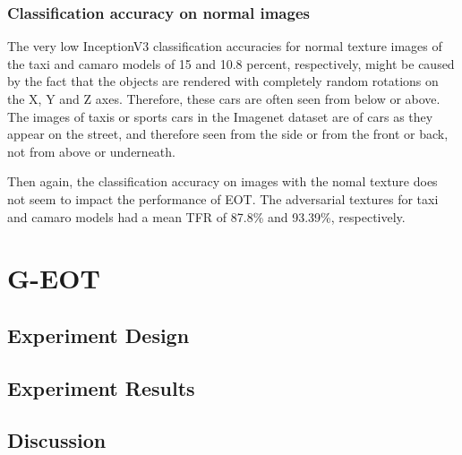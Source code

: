 \subsubsection{Classification accuracy on normal images}

The very low InceptionV3 classification accuracies for normal texture images of the taxi and camaro models of 15 and 10.8 percent, respectively, might be caused by the fact that the objects are rendered with completely random rotations on the X, Y and Z axes. Therefore, these cars are often seen from below or above. The images of taxis or sports cars in the Imagenet dataset are of cars as they appear on the street, and therefore seen from the side or from the front or back, not from above or underneath.

Then again, the classification accuracy on images with the nomal texture does not seem to impact the performance of EOT. The adversarial textures for taxi and camaro models had a mean TFR of 87.8\% and 93.39\%, respectively.

\section{G-EOT}

\subsection{Experiment Design}

\subsection{Experiment Results}
    \label{sec:experiment_design}
    
\subsection{Discussion}
